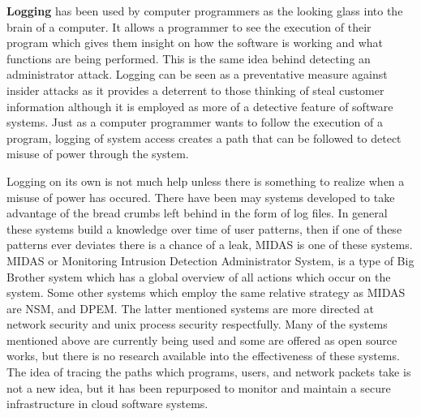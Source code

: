 \label{hlLogging}

\textbf{Logging} has been used by computer programmers as the looking glass into the brain of a computer. It allows a programmer to see the execution of their program which gives them insight on how the software is working and what functions are being performed. This is the same idea behind detecting an administrator attack. Logging can be seen as a preventative measure against insider attacks as it provides a deterrent to those thinking of steal customer information although it is employed as more of a detective feature of software systems.\cite{sirer} Just as a computer programmer wants to follow the execution of a program, logging of system access creates a path that can be followed to detect misuse of power through the system.

Logging on its own is not much help unless there is something to realize when a misuse of power has occured.\cite{althebyan} There have been may systems developed to take advantage of the bread crumbs left behind in the form of log files. In general these systems build a knowledge over time of user patterns, then if one of these patterns ever deviates there is a chance of a leak, MIDAS is one of these systems. MIDAS or Monitoring Intrusion Detection Administrator System, is a type of Big Brother system which has a global overview of all actions which occur on the system.\cite{nguyen} Some other systems which employ the same relative strategy as MIDAS are NSM, and DPEM. The latter mentioned systems are more directed at network security and unix process security respectfully. Many of the systems mentioned above are currently being used and some are offered as open source works, but there is no research available into the effectiveness of these systems. The idea of tracing the paths which programs, users, and network packets take is not a new idea, but it has been repurposed to monitor and maintain a secure infrastructure in cloud software systems.\cite{nguyen}\cite{mukherjee}


\label{hlSecureHW}

